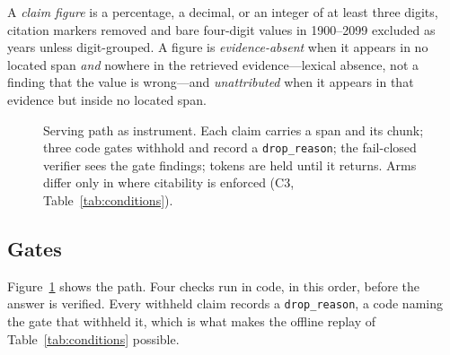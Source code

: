 \documentclass[conference,a4paper]{IEEEtran}
\begin{document}
A \emph{claim figure} is a percentage, a decimal, or an integer of at least three digits,
citation markers removed and bare four-digit values in 1900--2099 excluded as years unless
digit-grouped. A figure is \emph{evidence-absent} when it appears in no located span \emph{and} nowhere in
the retrieved evidence---lexical absence, not a finding that the value is wrong---and
\emph{unattributed} when it appears in that evidence but inside no located span.

\begin{figure}[t]
\centering
{}
\caption{Serving path as instrument. Each claim carries a span and its chunk; three code
gates withhold and record a \texttt{drop\_reason}; the fail-closed verifier sees the gate
findings; tokens are held until it returns. Arms differ only in where citability is enforced
(C3, Table~\ref{tab:conditions}).}
\label{fig:pipeline}
\end{figure}

\subsection{Gates}
Figure~\ref{fig:pipeline} shows the path. Four checks run in code, in this order, before the
answer is verified. Every withheld claim records a \texttt{drop\_reason}, a code naming the
gate that withheld it, which is what makes the offline replay of Table~\ref{tab:conditions}
possible.
\end{document}
